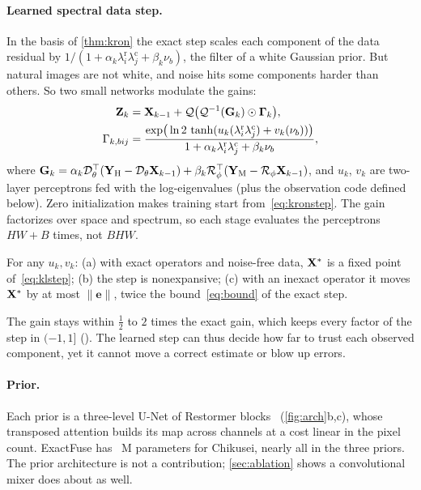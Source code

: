 \documentclass[10pt,twocolumn,letterpaper]{article}
\begin{document}
\paragraph{Learned spectral data step.} In the basis of \cref{thm:kron} the exact step scales each component of the data residual by $1/(1+\alpha_k\lambda^{\mathrm{r}}_i\lambda^{\mathrm{c}}_j+\beta_k\nu_b)$, the filter of a white Gaussian prior. But natural images are not white, and noise hits some components harder than others. So two small networks modulate the gains:
\begin{equation}
\begin{split}
\mathbf{Z}_k&=\mathbf{X}_{k-1}+\mathcal{Q}\big(\mathcal{Q}^{-1}(\mathbf{G}_k)\odot\boldsymbol{\Gamma}_k\big),\\
\Gamma_{k,bij}&=\frac{\exp\!\big(\ln2\,\tanh(u_k(\lambda^{\mathrm{r}}_i\lambda^{\mathrm{c}}_j)+v_k(\nu_b))\big)}{1+\alpha_k\lambda^{\mathrm{r}}_i\lambda^{\mathrm{c}}_j+\beta_k\nu_b},
\end{split}
\label{eq:klstep}
\end{equation}
where $\mathbf{G}_k=\alpha_k\mathcal{D}_\theta^{\top}(\mathbf{Y}_{\mathrm{H}}-\mathcal{D}_\theta\mathbf{X}_{k-1})+\beta_k\mathcal{R}_\phi^{\top}(\mathbf{Y}_{\mathrm{M}}-\mathcal{R}_\phi\mathbf{X}_{k-1})$, and $u_k$, $v_k$ are two-layer perceptrons fed with the log-eigenvalues (plus the observation code defined below). Zero initialization makes training start from~\eqref{eq:kronstep}. The gain factorizes over space and spectrum, so each stage evaluates the perceptrons $HW+B$ times, not $BHW$.
\begin{proposition}
\label{prop:kl}
For any $u_k,v_k$: (a) with exact operators and noise-free data, $\mathbf{X}^*$ is a fixed point of~\eqref{eq:klstep}; (b) the step is nonexpansive; (c) with an inexact operator it moves $\mathbf{X}^*$ by at most $\|\mathbf{e}\|$, twice the bound~\eqref{eq:bound} of the exact step.
\end{proposition}
The gain stays within $\tfrac12$ to $2$ times the exact gain, which keeps every factor of the step in $(-1,1]$ (\supp). The learned step can thus decide how far to trust each observed component, yet it cannot move a correct estimate or blow up errors.

\paragraph{Prior.} Each prior is a three-level U-Net of Restormer blocks~\cite{zamir2022restormer} (\cref{fig:arch}b,c), whose transposed attention builds its map across channels at a cost linear in the pixel count. ExactFuse has ~M parameters for Chikusei, nearly all in the three priors. The prior architecture is not a contribution; \cref{sec:ablation} shows a convolutional mixer does about as well.
\end{document}

